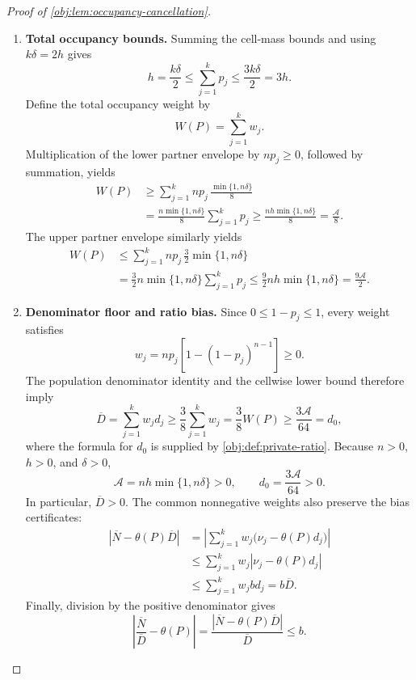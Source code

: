 \begin{proof}[Proof of \cref{obj:lem:occupancy-cancellation}]
\begin{enumerate}
\item \textbf{Total occupancy bounds.}
Summing the cell-mass bounds and using \(k\delta=2h\) gives
\[
h=\frac{k\delta}{2}
\le\sum_{j=1}^k p_j
\le\frac{3k\delta}{2}=3h.
\]
Define the total occupancy weight by
\[
W(P)=\sum_{j=1}^k w_j.
\]
Multiplication of the lower partner envelope by \(np_j\ge0\), followed by summation, yields
\[
\begin{aligned}
W(P)
&\ge
\sum_{j=1}^k np_j\,
 \frac{\min\{1,n\delta\}}8\\
&=
\frac{n\min\{1,n\delta\}}8\sum_{j=1}^k p_j
\ge\frac{nh\min\{1,n\delta\}}8
=\frac{\mathcal A}{8}.
\end{aligned}
\]
The upper partner envelope similarly yields
\[
\begin{aligned}
W(P)
&\le
\sum_{j=1}^k np_j\,
 \frac32\min\{1,n\delta\}\\
&=
\frac32n\min\{1,n\delta\}\sum_{j=1}^k p_j
\le\frac92nh\min\{1,n\delta\}
=\frac{9\mathcal A}{2}.
\end{aligned}
\]

\item \textbf{Denominator floor and ratio bias.}
Since \(0\le1-p_j\le1\), every weight satisfies
\[
w_j=np_j\left[1-(1-p_j)^{n-1}\right]\ge0.
\]
The population denominator identity and the cellwise lower bound therefore imply
\[
\overline D
=\sum_{j=1}^k w_jd_j
\ge\frac38\sum_{j=1}^k w_j
=\frac38W(P)
\ge\frac{3\mathcal A}{64}
=d_0,
\]
where the formula for \(d_0\) is supplied by
\cref{obj:def:private-ratio}. Because \(n>0\), \(h>0\), and \(\delta>0\),
\[
\mathcal A=nh\min\{1,n\delta\}>0,
\qquad
d_0=\frac{3\mathcal A}{64}>0.
\]
In particular, \(\overline D>0\). The common nonnegative weights also preserve the bias certificates:
\[
\begin{aligned}
|\overline N-\theta(P)\overline D|
&=
\left|\sum_{j=1}^k
w_j\bigl(\nu_j-\theta(P)d_j\bigr)\right|\\
&\le
\sum_{j=1}^k w_j
 \left|\nu_j-\theta(P)d_j\right|\\
&\le
\sum_{j=1}^k w_jbd_j
=b\overline D.
\end{aligned}
\]
Finally, division by the positive denominator gives
\[
\left|\frac{\overline N}{\overline D}-\theta(P)\right|
=
\frac{|\overline N-\theta(P)\overline D|}{\overline D}
\le b.
\]
\end{enumerate}
\end{proof}
